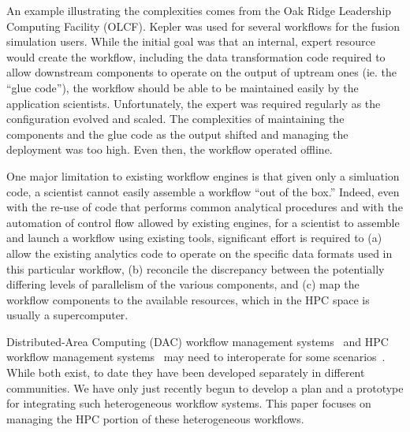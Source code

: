 \documentclass[conference]{IEEEtran}
\begin{document}
An example illustrating the complexities comes from the Oak Ridge
Leadership Computing Facility (OLCF).  Kepler was used for several workflows
for the fusion simulation users.  While the initial goal was that an internal,
expert resource would create the workflow,
including the data transformation code required
to allow downstream components to operate on the output of
uptream ones (ie. the ``glue code''),
the workflow should be able to be maintained
easily by the application scientists. Unfortunately,
the expert was required regularly as the configuration evolved and scaled.
The complexities of maintaining the components and the glue code as the output
shifted and managing the deployment was too high.
Even then, the workflow operated offline.

One major limitation to existing workflow engines is that
given only a simluation code, a scientist cannot easily
assemble a workflow ``out of the box.''
Indeed, even with the re-use of code that performs
common analytical procedures and with the automation of control flow
allowed by existing engines,
for a scientist to assemble
and launch a workflow using existing tools,
significant effort is required to (a) allow the existing
analytics code
to operate on the specific data formats used in this
particular workflow,
(b) reconcile the discrepancy between the potentially
differing levels of parallelism
of the various components,
and (c) map the workflow components
to the available resources, which in the HPC space
is usually a supercomputer.



Distributed-Area Computing
(DAC) workflow management
systems~\cite{tejedor:2015:pycompss,deelman:2015:pegasus} and HPC workflow
management systems~\cite{dorier:2015:in-situ-lessons} may need to interoperate
for some scenarios~\cite{deelman:2015:workflows-report}. While both exist, to
date they have been developed separately in different communities. We have only
just recently begun to develop a plan and a prototype for integrating such
heterogeneous workflow systems. This paper focuses on managing the HPC portion of
these heterogeneous workflows.
\fi
\end{document}
